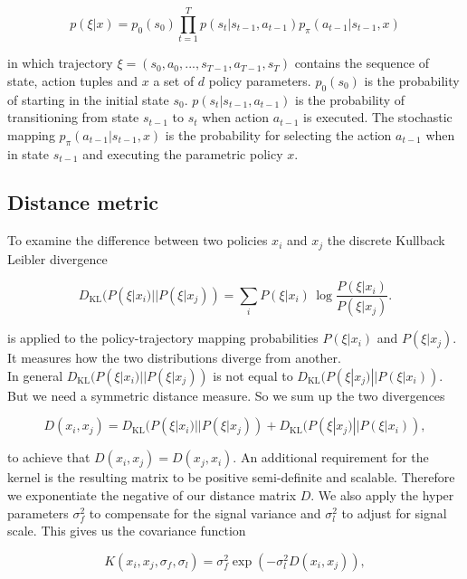 $$p(\xi|x) = p_{0}(s_{0}) \prod_{t=1}^{T} p(s_{t}|s_{t-1}, a_{t-1}) p_{\pi}(a_{t-1}|s_{t-1}, x)$$

in which trajectory $\xi=(s_{0},a_{0}, ..., s_{T-1}, a_{T-1}, s_{T})$ contains the sequence of state, action tuples and $x$ a set of $d$ policy parameters. $p_{0}(s_{0})$ is the probability of starting in the initial state $s_{0}$. $p(s_{t}|s_{t-1}, a_{t-1})$ is the probability of transitioning from state $s_{t-1}$ to $s_{t}$ when action $a_{t-1}$ is executed. The stochastic mapping $p_{\pi}(a_{t-1}|s_{t-1},x)$ is the probability for selecting the action $a_{t-1}$ when in state $s_{t-1}$ and executing the parametric policy $x$.

\subsection{Distance metric}

 To examine the difference between two policies $x_{ i }$ and $x_{ j }$ the discrete Kullback Leibler divergence

$$D_{\mathrm {KL} }(P(\xi|x_{ i })||P(\xi|x_{ j })) = \sum _{i}P(\xi|x_{ i })\,\log {\frac {P(\xi|x_{ i })}{P(\xi|x_{ j })}}.$$

is applied to the policy-trajectory mapping probabilities $P(\xi|x_{ i })$ and $P(\xi|x_{ j })$. It measures how the two distributions diverge from another.\\

In general $D_{\mathrm {KL} }(P(\xi|x_{ i })||P(\xi|x_{ j }))$ is not equal to $D_{\mathrm {KL} }(P(\xi|x_{ j })||P(\xi|x_{ i }))$. But we need a symmetric distance measure. So we sum up the two divergences

$$D(x_{ i }, x_{ j }) = D_{\mathrm {KL} }(P(\xi|x_{ i })||P(\xi|x_{ j })) + D_{\mathrm {KL} }(P(\xi|x_{ j })||P(\xi|x_{ i })),$$

to achieve that $D(x_{ i }, x_{ j }) = D(x_{ j }, x_{ i })$. An additional requirement for the kernel is the resulting matrix to be positive semi-definite and scalable\cite{wilson2014using}. Therefore we exponentiate the negative of our distance matrix $D$. We also apply the hyper parameters $\sigma_f^2$ to compensate for the signal variance and $\sigma_l^2$ to adjust for signal scale. This gives us the covariance function

\begin{equation} \label{eq:trajKernel}
K(x_{ i },x_{ j },\sigma_f,\sigma_l) = \sigma_f^2 \exp(-\sigma_l^2 D(x_{ i }, x_{ j })),
\end{equation}

